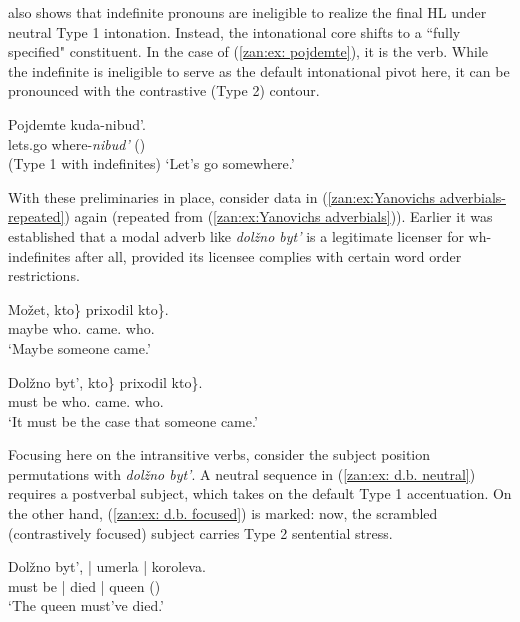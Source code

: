 \documentclass[output=paper,colorlinks,citecolor=brown]{langscibook}
\begin{document}
\noindent \citet{yokoyama1987discourse} also shows that indefinite pronouns are ineligible to realize the final HL under neutral Type 1 intonation. Instead, the intonational core shifts to a ``fully specified" constituent. In the case of (\ref{zan:ex: pojdemte}), it is the verb. While the indefinite is ineligible to serve as the default intonational pivot here, it can be pronounced with the contrastive (Type 2) contour. 

\ea \label{zan:ex: pojdemte}
    \gll Pojdemte  kuda-nibud'.\\ 
    lets.go  where-\textit{nibud'} (\searrow)\\ \hfill{(Type 1 with indefinites)}
    \glt      `Let's go somewhere.' 
\z

\noindent  With these preliminaries in place, consider  data in (\ref{zan:ex:Yanovichs adverbials-repeated}) again (repeated from (\ref{zan:ex:Yanovichs adverbials})). Earlier it was established that a modal adverb like \textit{dolžno byt'} is a legitimate licenser for wh-indefinites after all, provided its licensee complies with certain word order restrictions.

\ea \label{zan:ex:Yanovichs adverbials-repeated}
\ea
        \gll Možet, \minsp{\{} kto\} prixodil \minsp{\{} kto\}. \\
      maybe {} who.{\INDF} came.{\MASC} {} who.{\INDF}\\
      \glt `Maybe someone came.' 

\ex \label{dolzhno byt'} \label{zan:ex:dolzno byt' kto prixodil-repeated}
        \gll Dolžno byt', \minsp{\{*} kto\} prixodil \minsp{\{} kto\}. \\
       must be {} who.{\INDF}  came.{\MASC} {} who.{\INDF}\\
      \glt `It must be the case that someone came.'
\z
\z

\noindent Focusing here on the intransitive verbs, consider the subject position permutations with \textit{dolžno byt'}. A neutral sequence in (\ref{zan:ex: d.b. neutral}) requires a postverbal subject, which takes on the default Type 1 accentuation. On the other hand, (\ref{zan:ex: d.b. focused}) is marked: now, the scrambled (contrastively focused) subject carries Type 2 sentential stress.  

\ea
\ea \label{zan:ex: d.b. neutral}
   \gll Dolžno byt', | umerla | koroleva.\\
       must be | died | queen (\searrow)\\
       \glt `The queen must've died.' 
       
\end{document}

